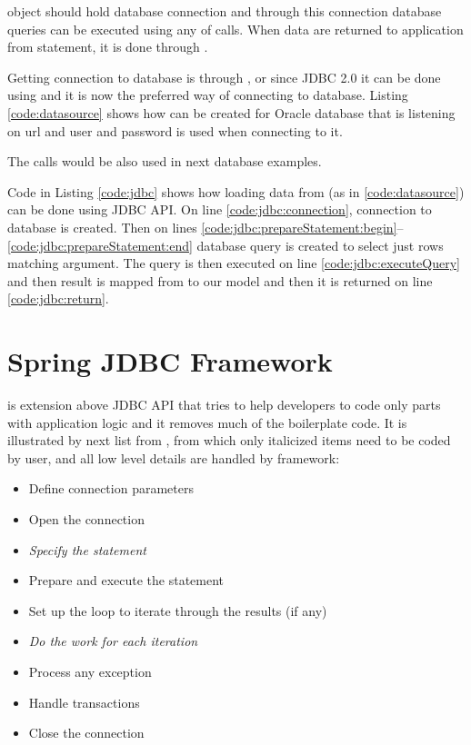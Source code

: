  object should hold database connection and through this connection
database queries can be executed using any of  calls.
When data are returned to application from statement, it is done through .

Getting connection to database is through , or since JDBC 2.0
it can be done using  and it is now the preferred way of connecting to database.
Listing \ref{code:datasource} shows how  can be created for Oracle database
that is listening on url 
and  user and  password is used when connecting to it.

The  calls would be also used in next database examples.


Code in Listing \ref{code:jdbc} shows how loading data from 
(as in \ref{code:datasource}) can be done using JDBC API.
On line \ref{code:jdbc:connection}, connection to database is created.
Then on lines \ref{code:jdbc:prepareStatement:begin}--\ref{code:jdbc:prepareStatement:end}
database query is created to select just rows matching  argument.
The query is then executed on line \ref{code:jdbc:executeQuery} and then
result is mapped from  to our  model and then it is returned on line \ref{code:jdbc:return}.





\section{Spring JDBC Framework \label{frameworks:jdbcTemplate}}
\citet{SpringJDBC} is extension above JDBC API that tries to help developers to code only
parts with application logic and it removes much of the boilerplate code.
It is illustrated by next list from \citet{SpringJDBC}, from which only
italicized items need to be coded by user, and all low level details
are handled by framework:
\begin{itemize}
  \item Define connection parameters
  \item Open the connection
  \item \textit{Specify the statement}
  \item Prepare and execute the statement
  \item Set up the loop to iterate through the results (if any)
  \item \textit{Do the work for each iteration}
  \item Process any exception
  \item Handle transactions
  \item Close the connection   
\end{itemize}

